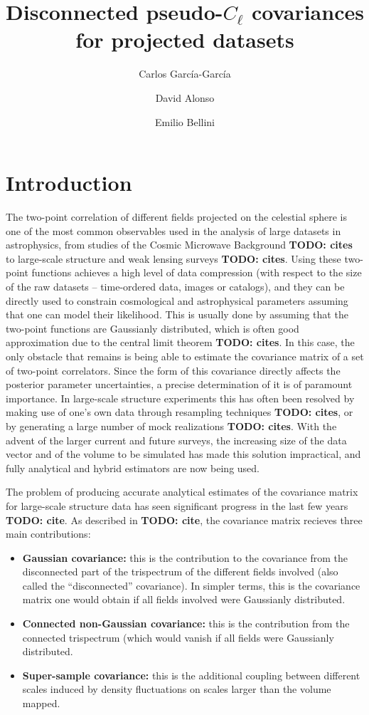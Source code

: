 \documentclass[a4paper,11pt]{article}
\title{\boldmath Disconnected pseudo-$C_\ell$ covariances for projected datasets}
\author[a]{Carlos Garc\'{i}a-Garc\'{i}a}
\author[b]{David Alonso}
\author[b]{Emilio Bellini}
\affiliation[a]{Instituto de Física Fundamental, Consejo Superior de Investigaciones Científicas, c/. Serrano 123, E–28006, Madrid, Spain}
\affiliation[b]{Oxford Astrophysics, Department of Physics, Keble Road, Oxford, OX1 3RH, UK}
\newcommand{\todo}[1]{{\bf TODO: #1}}
\begin{document}
  \maketitle
  \flushbottom

  \section{Introduction}\label{sec:intro}
    The two-point correlation of different fields projected on the celestial sphere is one of the most common observables used in the analysis of large datasets in astrophysics, from studies of the Cosmic Microwave Background \todo{cites} to large-scale structure and weak lensing surveys \todo{cites}. Using these two-point functions achieves a high level of data compression (with respect to the size of the raw datasets -- time-ordered data, images or catalogs), and they can be directly used to constrain cosmological and astrophysical parameters assuming that one can model their likelihood. This is usually done by assuming that the two-point functions are Gaussianly distributed, which is often good approximation due to the central limit theorem \todo{cites}. In this case, the only obstacle that remains is being able to estimate the covariance matrix of a set of two-point correlators. Since the form of this covariance directly affects the posterior parameter uncertainties, a precise determination of it is of paramount importance. In large-scale structure experiments this has often been resolved by making use of one's own data through resampling techniques \todo{cites}, or by generating a large number of mock realizations \todo{cites}. With the advent of the larger current and future surveys, the increasing size of the data vector and of the volume to be simulated has made this solution impractical, and fully analytical and hybrid estimators are now being used.
  
    The problem of producing accurate analytical estimates of the covariance matrix for large-scale structure data has seen significant progress in the last few years \todo{cite}. As described in \todo{cite}, the covariance matrix recieves three main contributions:
    \begin{itemize}
      \item {\bf Gaussian covariance:} this is the contribution to the covariance from the disconnected part of the trispectrum of the different fields involved (also called the ``disconnected'' covariance). In simpler terms, this is the covariance matrix one would obtain if all fields involved were Gaussianly distributed.
      \item {\bf Connected non-Gaussian covariance:} this is the contribution from the connected trispectrum (which would vanish if all fields were Gaussianly distributed.
      \item {\bf Super-sample covariance:} this is the additional coupling between different scales induced by density fluctuations on scales larger than the volume mapped.
    \end{itemize}
  
\end{document}
